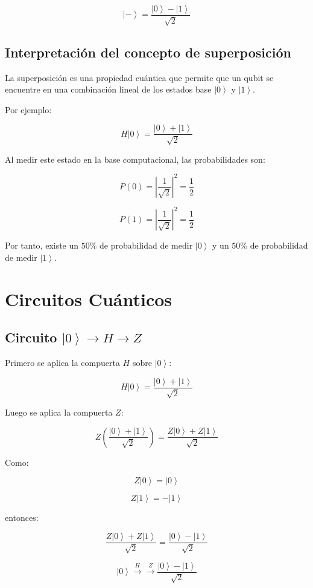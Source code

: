 \documentclass[12pt,a4paper]{article}
\newcommand{\ket}[1]{\left|#1\right\rangle}
\begin{document}
\[
\ket{-}=\frac{\ket{0}-\ket{1}}{\sqrt{2}}
\]

\subsection{Interpretación del concepto de superposición}

La superposición es una propiedad cuántica que permite que un qubit se encuentre en una combinación lineal de los estados base \(\ket{0}\) y \(\ket{1}\).

Por ejemplo:

\[
H\ket{0}=
\frac{\ket{0}+\ket{1}}{\sqrt{2}}
\]

Al medir este estado en la base computacional, las probabilidades son:

\[
P(0)=\left|\frac{1}{\sqrt{2}}\right|^2=\frac{1}{2}
\]

\[
P(1)=\left|\frac{1}{\sqrt{2}}\right|^2=\frac{1}{2}
\]

Por tanto, existe un \(50\%\) de probabilidad de medir \(\ket{0}\) y un \(50\%\) de probabilidad de medir \(\ket{1}\).

\section{Circuitos Cuánticos}

\subsection{Circuito \texorpdfstring{$\ket{0}\rightarrow H\rightarrow Z$}{ket 0 H Z}}

Primero se aplica la compuerta \(H\) sobre \(\ket{0}\):

\[
H\ket{0}=
\frac{\ket{0}+\ket{1}}{\sqrt{2}}
\]

Luego se aplica la compuerta \(Z\):

\[
Z\left(
\frac{\ket{0}+\ket{1}}{\sqrt{2}}
\right)
=
\frac{Z\ket{0}+Z\ket{1}}{\sqrt{2}}
\]

Como:

\[
Z\ket{0}=\ket{0}
\]

\[
Z\ket{1}=-\ket{1}
\]

entonces:

\[
\frac{Z\ket{0}+Z\ket{1}}{\sqrt{2}}
=
\frac{\ket{0}-\ket{1}}{\sqrt{2}}
\]

\begin{resultado}
\[
\boxed{
\ket{0}\xrightarrow{H}\xrightarrow{Z}
\frac{\ket{0}-\ket{1}}{\sqrt{2}}
}
\]
\end{resultado}
\end{document}
